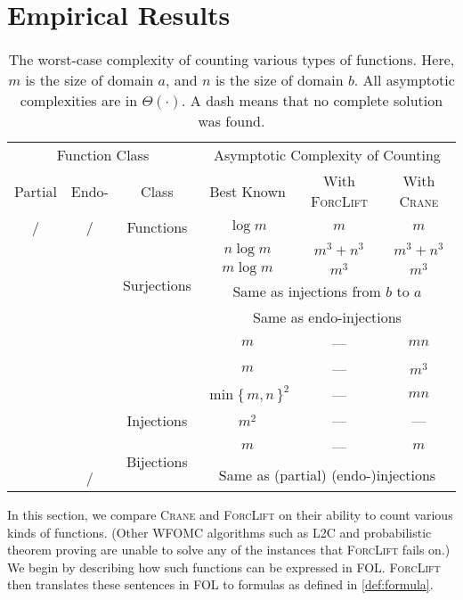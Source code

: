 \documentclass[letterpaper]{article} %
\newcommand{\cmark}{\ding{51}}%
\newcommand{\xmark}{\ding{55}}%
\theoremstyle{definition}
\theoremstyle{remark}
\begin{document}
\section{Empirical Results}\label{sec:results} %

\begin{table*}[t]
  \centering
  \begin{tabular}{cccccc}
    \toprule
    \multicolumn{3}{c}{Function Class} & \multicolumn{3}{c}{Asymptotic Complexity of Counting} \\
    Partial & Endo- & Class & Best Known & With \textsc{ForcLift} & With \textsc{Crane} \\
    \midrule
    \rowcolor{gray!10}\cmark/\xmark & \cmark/\xmark & Functions & $\log m$ & $m$ & $m$ \\
    \xmark & \xmark & \multirow{4}{*}{Surjections} & $n \log m$ & $m^{3}+n^{3}$ & $m^{3}+n^{3}$ \\
    \xmark & \cmark & & $m \log m$ & $m^{3}$ & $m^{3}$ \\
    \cmark & \xmark & & \multicolumn{3}{c}{Same as injections from $b$ to $a$} \\
    \cmark & \cmark & & \multicolumn{3}{c}{Same as endo-injections} \\
    \rowcolor{gray!10}\xmark & \xmark & & $m$ & --- & $mn$ \\
    \rowcolor{gray!10}\xmark & \cmark & & $m$ & --- & $m^3$ \\
    \rowcolor{gray!10}\cmark & \xmark & & $\min\{\, m, n \,\}^2$ & --- & $mn$ \\
    \rowcolor{gray!10}\cmark & \cmark & \multirow{-4}{*}{Injections} & $m^2$ & --- & --- \\
    \xmark & \xmark & \multirow{3}{*}{Bijections} & $m$ & --- & $m$ \\
    \xmark & \cmark & & \multicolumn{3}{c}{\multirow{2}{*}{Same as (partial) (endo-)injections}} \\
    \cmark & \cmark/\xmark & & \multicolumn{3}{c}{} \\
    \bottomrule
  \end{tabular}
  \caption{The worst-case complexity of counting various types of functions.
    Here, $m$ is the size of domain $a$, and $n$ is the size of domain $b$. All
    asymptotic complexities are in $\Theta(\cdot)$. A dash means that no
    complete solution was found.}\label{tbl:results}
\end{table*}

In this section, we compare \textsc{Crane} and \textsc{ForcLift}
\citep{DBLP:conf/ijcai/BroeckTMDR11} on their ability to count various kinds of
functions. (Other WFOMC algorithms such as \textsc{L2C}
\citep{DBLP:conf/kr/KazemiP16} and probabilistic theorem proving
\citep{DBLP:journals/cacm/GogateD16} are unable to solve any of the instances
that \textsc{ForcLift} fails on.) We begin by describing how such functions can
be expressed in FOL\@. \textsc{ForcLift} then translates these sentences in FOL
to formulas as defined in \cref{def:formula}.
\end{document}
